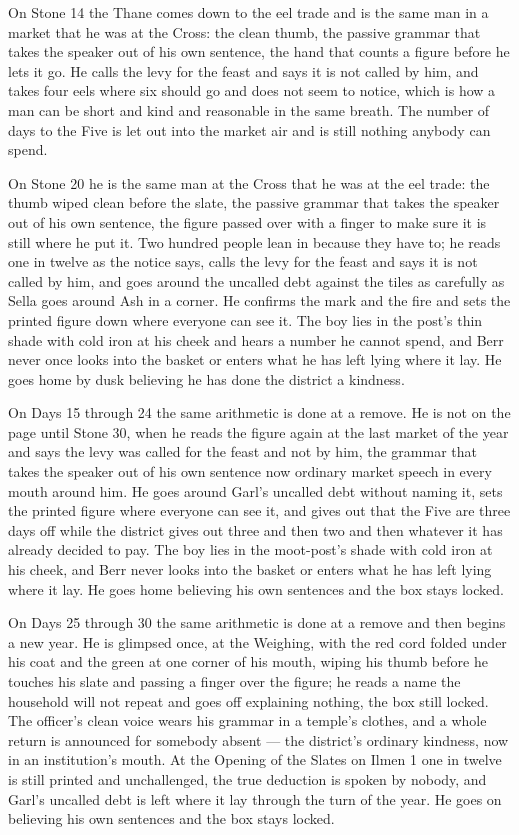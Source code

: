 \documentclass{design/chronicle}
\begin{document}
{On Stone 14 the Thane comes down to the eel trade and is the same man in a market that he was at the Cross: the clean thumb, the passive grammar that takes the speaker out of his own sentence, the hand that counts a figure before he lets it go. He calls the levy for the feast and says it is not called by him, and takes four eels where six should go and does not seem to notice, which is how a man can be short and kind and reasonable in the same breath. The number of days to the Five is let out into the market air and is still nothing anybody can spend.

On Stone 20 he is the same man at the Cross that he was at the eel trade: the thumb wiped clean before the slate, the passive grammar that takes the speaker out of his own sentence, the figure passed over with a finger to make sure it is still where he put it. Two hundred people lean in because they have to; he reads one in twelve as the notice says, calls the levy for the feast and says it is not called by him, and goes around the uncalled debt against the tiles as carefully as Sella goes around Ash in a corner. He confirms the mark and the fire and sets the printed figure down where everyone can see it. The boy lies in the post’s thin shade with cold iron at his cheek and hears a number he cannot spend, and Berr never once looks into the basket or enters what he has left lying where it lay. He goes home by dusk believing he has done the district a kindness.

On Days 15 through 24 the same arithmetic is done at a remove. He is not on the page until Stone 30, when he reads the figure again at the last market of the year and says the levy was called for the feast and not by him, the grammar that takes the speaker out of his own sentence now ordinary market speech in every mouth around him. He goes around Garl’s uncalled debt without naming it, sets the printed figure where everyone can see it, and gives out that the Five are three days off while the district gives out three and then two and then whatever it has already decided to pay. The boy lies in the moot-post’s shade with cold iron at his cheek, and Berr never looks into the basket or enters what he has left lying where it lay. He goes home believing his own sentences and the box stays locked.

On Days 25 through 30 the same arithmetic is done at a remove and then begins a new year. He is glimpsed once, at the Weighing, with the red cord folded under his coat and the green at one corner of his mouth, wiping his thumb before he touches his slate and passing a finger over the figure; he reads a name the household will not repeat and goes off explaining nothing, the box still locked. The officer’s clean voice wears his grammar in a temple’s clothes, and a whole return is announced for somebody absent --- the district’s ordinary kindness, now in an institution’s mouth. At the Opening of the Slates on Ilmen 1 one in twelve is still printed and unchallenged, the true deduction is spoken by nobody, and Garl’s uncalled debt is left where it lay through the turn of the year. He goes on believing his own sentences and the box stays locked.

}
\end{document}
